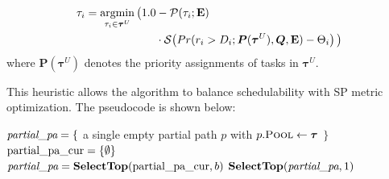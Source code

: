     \begin{equation}
    \begin{split}
        \tau_i = \mathop{\mathrm{argmin}}_{\tau_i \in \boldsymbol{\tau}^{U}} \big( 1.0 & - \mathcal{P}(\tau_i; \textbf{E}) \\
        & \cdot \mathcal{S}\!\left(Pr(r_i > D_i ; \boldsymbol{P}(\boldsymbol{\tau}^{U}), \boldsymbol{Q}, \textbf{E}) - \Theta_i\right) \big)
    \end{split}
    \label{eq:cabs_goal}
    \end{equation}
    where $\boldsymbol{P}(\boldsymbol{\tau}^{U})$ denotes the priority assignments of tasks in $\boldsymbol{\tau}^{U}$.
    
This heuristic allows the algorithm to balance schedulability with SP metric optimization.
The pseudocode is shown below:

	\begin{algorithm}[htbp]
		\caption{Constrained Audsley Beam Search (CABS)} \label{alg:cabs}
		$\textit{partial}\_\textit{pa} = \{$ a single empty partial path $p$ with $p.\textsc{Pool} \leftarrow \boldsymbol{\tau}$ $\}$ 
		{
			$\text{partial}\_\text{pa}\_\text{cur}=\{\emptyset\}$\\
			$\textit{partial}\_\textit{pa} = \textbf{SelectTop}(\text{partial}\_\text{pa}\_\text{cur}, b)$ 
		}
		\KwRet $\textbf{SelectTop}(\textit{partial}\_\textit{pa}, 1)$
	\end{algorithm}

